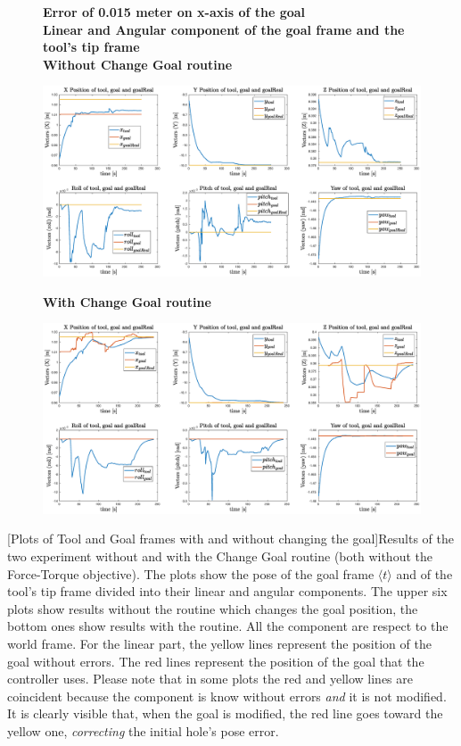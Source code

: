 \begin{figure} [H]
	\centering
	\textbf{Error of 0.015 meter on x-axis of the goal}\\
	\textbf{Linear and Angular component of the goal frame and the tool's tip frame}\\
\vspace{20px}
\textbf{Without Change Goal routine\\}
	\centerline{
		\includegraphics[width=22cm]{error_nothing/6_error.eps}
	}
	\vspace{15px}
\textbf{With Change Goal routine}
	\centerline{
		\includegraphics[width=22cm]{error_goal/6_error.eps}
	}
\end{figure} 
[Plots of Tool and Goal frames with and without changing the goal]{Results of the two experiment without and with the Change Goal routine (both without the Force-Torque objective). The plots show the pose of the goal frame $ \langle t \rangle$ and of the tool's tip frame divided into their linear and angular components. The upper six plots show results without the routine which changes the goal position, the bottom ones show results with the routine. All the component are respect to the world frame. For the linear part, the yellow lines represent the position of the goal without errors. The red lines represent the position of the goal that the controller uses. Please note that in some plots the red and yellow lines are coincident because the component is know without errors \emph{and} it is not modified. It is clearly visible that, when the goal is modified, the red line goes toward the yellow one, \textit{correcting} the initial hole's pose error.}
\label{fig:Error_nothingandgoal_plot6}
\vspace{40px}




